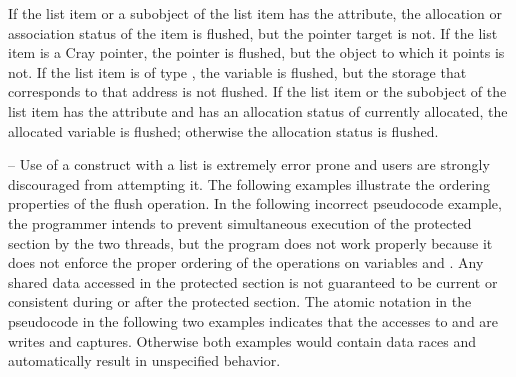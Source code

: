 \fortranspecificstart
If the list item or a subobject of the list item has the  attribute, the allocation 
or association status of the  item is flushed, but the pointer target is not. If the 
list item is a Cray pointer, the pointer is flushed, but the object to which it points is not. 
If the list item is of type , the variable is flushed, but the storage that corresponds 
to that address is not flushed. If the list item or the subobject of the list item has the 
 attribute and has an allocation status of currently allocated, the 
allocated variable is flushed; otherwise the allocation status is flushed.
\fortranspecificend

\begin{samepage}
\notestart
\noteheader – Use of a  construct with a list is extremely error prone and users are 
strongly discouraged from attempting it. The following examples illustrate the ordering 
properties of the flush operation. In the following incorrect pseudocode example, the 
programmer intends to prevent simultaneous execution of the protected section by the 
two threads, but the program does not work properly because it does not enforce the 
proper ordering of the operations on variables  and . Any shared data accessed in the 
protected section is not guaranteed to be current or consistent during or after the 
protected section. The atomic notation in the pseudocode in the following two examples 
indicates that the accesses to  and  are  writes and captures. Otherwise both 
examples would contain data races and automatically result in unspecified behavior. 
\end{samepage}


